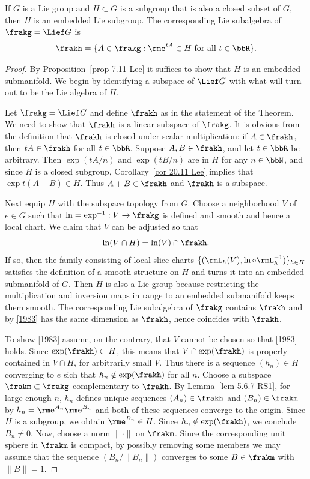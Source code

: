 \begin{thm}\label{thm closed subgroup}
    If $G$ is a Lie group and $H\subset G$ is a subgroup that is also a closed subset of $G$, then $H$ is an embedded Lie subgroup. The corresponding Lie subalgebra of $\frakg=\Lief G$ is 
    \[\frakh=\{A\in\frakg: \rme^{tA}\in H \text{ for all }t\in\bbR\}.\]
\end{thm}
\begin{proof}
    By Proposition~\ref{prop 7.11 Lee} it suffices to show that $H$ is an embedded submanifold. We begin by identifying a subspace of $\Lief G$ with what will turn out to be the Lie algebra of $H$.

    Let $\frakg=\Lief G$ and define $\frakh$ as in the statement of the Theorem. We need to show that $\frakh$ is a linear subspace of $\frakg$. It is obvious from the definition that $\frakh$ is closed under scalar multiplication: if $A\in\frakh$, then $tA\in\frakh$ for all $t\in \bbR$. Suppose $A,B\in\frakh$, and let $t \in\bbR$ be arbitrary. Then $\exp(tA/n)$ and $\exp(tB/n)$ are in $H$ for any $n\in \bbN$, and since $H$ is a closed subgroup, Corollary~\ref{cor 20.11 Lee} implies that $\exp t(A+B)\in H$. Thus $A+B\in\frakh$ and $\frakh$ is a subspace.

    Next equip $H$ with the subspace topology from $G$. Choose a neighborhood $V$ of $e\in G$ such that $\ln=\exp^{-1}:V\to \frakg$ is defined and smooth and hence a local chart. We claim that $V$ can be adjusted so that 
    \[\ln(V\cap H)=\ln(V)\cap \frakh.\label{1983}\]
    If so, then the family consisting of local slice charts $\{(\rmL_h(V),\ln\circ \rmL_{h}^{-1})\}_{h\in H}$ satisfies the definition of a smooth structure on $H$ and turns it into an embedded submanifold of $G$. Then $H$ is also a Lie group because restricting the multiplication and inversion maps in range to an embedded submanifold keeps them smooth. The corresponding Lie subalgebra of $\frakg$ contains $\frakh$ and by \eqref{1983} has the same dimension as $\frakh$, hence coincides with $\frakh$.

    To show \eqref{1983} assume, on the contrary, that $V$ cannot be chosen so that \eqref{1983} holds. Since $\exp(\frakh)\subset H$, this means that $V\cap \exp(\frakh)$ is properly contained in $V\cap H$, for arbitrarily small $V$. Thus there is a sequence $(h_n)\in H$ converging to $e$ sich that $h_n\notin \exp(\frakh)$ for all $n$. Choose a subspace $\frakm\subset\frakg$ complementary to $\frakh$. By Lemma~\ref{lem 5.6.7 RS1}, for large enough $n$, $h_n$ defines unique sequences $(A_n)\in \frakh$ and $(B_n)\in \frakm$ by $h_n=\rme^{A_n}\rme^{B_n}$ and both of these sequences converge to the origin. Since $H$ is a subgroup, we obtain $\rme^{B_n}\in H$. Since $h_n\notin\exp(\frakh)$, we conclude $B_n\neq 0$. Now, choose a norm $\lVert\cdot\rVert$ on $\frakm$. Since the corresponding unit sphere in $\frakm$ is compact, by possibly removing some members we may assume that the sequence $(B_n/\lVert B_n\rVert)$ converges to some $B\in\frakm$ with $\lVert B\rVert=1$. 
    

\end{proof}
